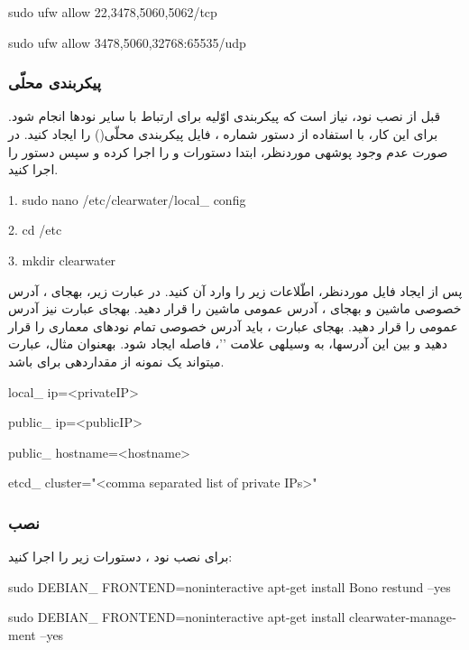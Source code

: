 \begin{latin}
\setlength{\parindent}{0ex}
sudo ufw allow 22,3478,5060,5062/tcp

sudo ufw allow 3478,5060,32768:65535/udp
\end{latin} 

\subsubsection{پیکربندی محلّی}
قبل از نصب نود، نیاز است که پیکربندی اوّلیه برای ارتباط با سایر نودها انجام شود. برای این کار، با استفاده از دستور شماره ، فایل پیکربندی محلّی() را ایجاد کنید. در صورت عدم وجود پوشه\nf ی موردنظر، ابتدا دستورات   و  را اجرا کرده و سپس دستور  را اجرا کنید.
\begin{latin}
\setlength{\parindent}{0ex}
1. sudo nano /etc/clearwater/local\_ config

2. cd  /etc

3. mkdir clearwater
\end{latin}

پس از ایجاد فایل موردنظر، اطّلاعات زیر را وارد آن کنید. در عبارت زیر، به\nf جای ، آدرس  خصوصی ماشین و به\nf جای ، آدرس  عمومی ماشین را قرار دهید. به\nf جای عبارت  نیز آدرس  عمومی را قرار دهید. به\nf جای عبارت ، باید آدرس  خصوصی تمام نودهای معماری  را قرار دهید و بین این آدرس\nf ها، به وسیله\nf ی علامت '\lr{,}'، فاصله ایجاد شود. به\nf عنوان مثال، عبارت  می\nf تواند یک نمونه از مقداردهی برای  باشد.

\nf 
\begin{latin}
\setlength{\parindent}{0ex}
local\_ ip=<privateIP>

public\_ ip=<publicIP>

public\_ hostname=<hostname>

etcd\_ cluster="<comma separated list of private IPs>"
\end{latin}

\subsubsection{نصب }
برای نصب نود ، دستورات زیر را اجرا کنید:
\begin{latin}
\setlength{\parindent}{0ex}
sudo DEBIAN\_ FRONTEND=noninteractive apt-get install Bono restund --yes

sudo DEBIAN\_ FRONTEND=noninteractive apt-get install clearwater-management --yes

\end{latin}

